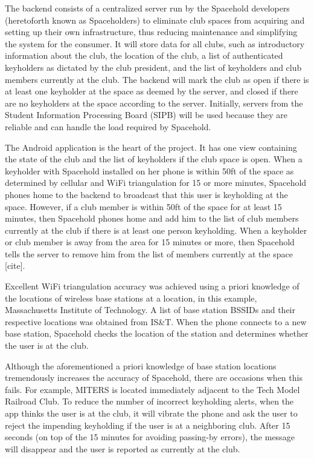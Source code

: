 \documentclass[11pt,twocolumn]{article}
\begin{document}
The backend consists of a centralized server run by the Spacehold developers (heretoforth known as Spaceholders) to eliminate club spaces from acquiring and setting up their own infrastructure, thus reducing maintenance and simplifying the system for the consumer. It will store data for all clubs, such as introductory information about the club, the location of the club, a list of authenticated keyholders as dictated by the club president, and the list of keyholders and club members currently at the club. The backend will mark the club as open if there is at least one keyholder at the space as deemed by the server, and closed if there are no keyholders at the space according to the server. Initially, servers from the Student Information Processing Board (SIPB) will be used because they are reliable and can handle the load required by Spacehold.

The Android application is the heart of the project. It has one view containing the state of the club and the list of keyholders if the club space is open. When a keyholder with Spacehold installed on her phone is within 50ft of the space as determined by cellular and WiFi triangulation for 15 or more minutes, Spacehold phones home to the backend to broadcast that this user is keyholding at the space. However, if a club member is within 50ft of the space for at least 15 minutes, then Spacehold phones home and add him to the list of club members currently at the club if there is at least one person keyholding. When a keyholder or club member is away from the area for 15 minutes or more, then Spacehold tells the server to remove him from the list of members currently at the space [cite].

Excellent WiFi triangulation accuracy was achieved using a priori knowledge of the locations of wireless base stations at a location, in this example, Massachusetts Institute of Technology. A list of base station BSSIDs and their respective locations was obtained from IS\&T. When the phone connects to a new base station, Spacehold checks the location of the station and determines whether the user is at the club.

Although the aforementioned a priori knowledge of base station locations tremendously increases the accuracy of Spacehold, there are occasions when this fails. For example, MITERS is located immediately adjacent to the Tech Model Railroad Club. To reduce the number of incorrect keyholding alerts, when the app thinks the user is at the club, it will vibrate the phone and ask the user to reject the impending keyholding if the user is at a neighboring club. After 15 seconds (on top of the 15 minutes for avoiding passing-by errors), the message will disappear and the user is reported as currently at the club.
\end{document}
